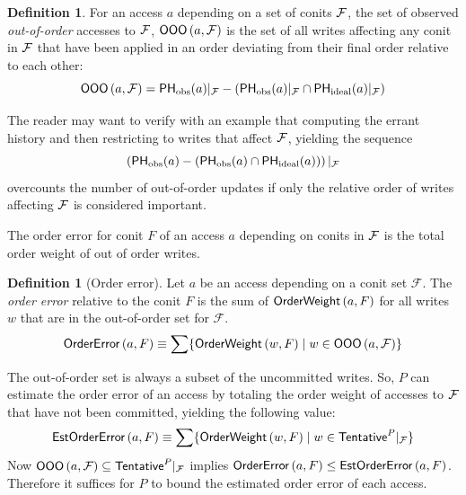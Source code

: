 \documentclass[]             %
{NASA}                       %
\theoremstyle{definition}
\newtheorem{definition}[theorem]{Definition}
\begin{document}
\begin{definition}
  For an access $a$ depending on a set of conits $\mathcal{F}$, the set of
  observed \emph{out-of-order} accesses to $\mathcal{F}$,
  $\mathsf{OOO}\left(a, \mathcal{F}\right)$ is the set of all writes
  affecting any conit in $\mathcal{F}$ that have been applied in an order
  deviating from their final order relative to each other:
\begin{equation}
  \mathsf{OOO}\left(a, \mathcal{F}\right)  = \mathsf{PH}_{\mathrm{obs}}(a)|_{\mathcal{F}} - \left(\mathsf{PH}_{\mathrm{obs}}(a)|_{\mathcal{F}} \cap \mathsf{PH}_{\mathrm{ideal}}(a)|_{\mathcal{F}} \right)
\end{equation}
\end{definition}

The reader may want to verify with an example that computing the
errant history and then restricting to writes that affect $\mathcal{F}$, yielding the sequence
\begin{equation*}
  \left(\mathsf{PH}_{\mathrm{obs}}(a) - \left(\mathsf{PH}_{\mathrm{obs}}(a) \cap \mathsf{PH}_{\mathrm{ideal}}(a)\right)\right)|_{\mathcal{F}}
\end{equation*}
overcounts the number of out-of-order updates if only the relative
order of writes affecting $\mathcal{F}$ is considered important.

The order error for conit $F$ of an access $a$ depending on conits
in $\mathcal{F}$ is the total order weight of out of order writes.
\begin{definition}[Order error]
  Let $a$ be an access depending on a conit set $\mathcal{F}$. The
  \emph{order error} relative to the conit $F$ is the sum of
  $\mathsf{OrderWeight}\left(a, F\right)$ for all writes $w$ that are in the
  out-of-order set for $\mathcal{F}$.
  \begin{equation}
    \mathsf{OrderError}\left(a, F\right) \equiv \sum \{ \mathsf{OrderWeight}\left(w, F\right) \mid w \in \mathsf{OOO}\left(a, \mathcal{F}\right) \}
  \end{equation}
\end{definition}

The out-of-order set is always a subset of the uncommitted writes. So, $P$
can estimate the order error of an access by totaling the order weight
of accesses to $\mathcal{F}$ that have not been committed, yielding the
following value:
\begin{equation}
  \mathsf{EstOrderError}\left(a, F \right) \equiv \sum \{ \mathsf{OrderWeight}\left(w, F\right) \mid w \in \mathsf{Tentative}^{P}|_{\mathcal{F}} \}
\end{equation}
Now
$\mathsf{OOO}\left(a, \mathcal{F}\right) \subseteq
\mathsf{Tentative}^{P}|_{\mathcal{F}}$ implies
$\mathsf{OrderError}\left(a, F\right) \leq \mathsf{EstOrderError}\left(a,
  F\right)$. Therefore it suffices for $P$ to bound the estimated
order error of each access.
\end{document}
